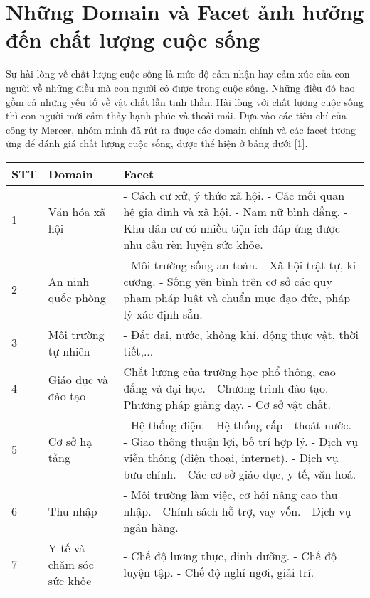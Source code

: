 \section{Những Domain và Facet ảnh hưởng đến chất lượng cuộc sống}
Sự hài lòng về chất lượng cuộc sống là mức độ cảm nhận hay cảm xúc của con người về những điều mà con người có được trong cuộc sống. Những điều đó bao gồm cả những yếu tố về vật chất lẫn tinh thần. Hài lòng với chất lượng cuộc sống thì con người mới cảm thấy hạnh phúc và thoải mái. Dựa vào các tiêu chí của công ty Mercer, nhóm mình đã rút ra được các domain chính và các facet tương ứng để đánh giá chất lượng cuộc sống, được thể hiện ở bảng dưới [1].
\begin{center}
\begin{tabular}{ | m{1.1cm} | m{4cm}| m{6.5cm} | } 
  \hline
  STT& Domain & Facet \\ 
  \hline
  1 & Văn hóa xã hội & - Cách cư xử, ý thức xã hội. \newline - Các mối quan hệ gia đình và xã hội. \newline - Nam nữ bình đẳng. \newline - Khu dân cư có nhiều tiện ích đáp ứng được nhu cầu rèn luyện sức khỏe.\\ 
  \hline
  2 & An ninh quốc phòng & - Môi trường sống an toàn. \newline - Xã hội trật tự, kỉ cương. \newline - Sống yên bình trên cơ sở các quy phạm pháp luật và chuẩn mực đạo đức, pháp lý xác định sẵn.  \\ 
  \hline
  3 & Môi trường tự nhiên & - Đất đai, nước, không khí, động thực vật, thời tiết,... \\ 
  \hline
  4 & Giáo dục và đào tạo & Chất lượng của trường học phổ thông, cao đẳng và đại  học. \newline - Chương trình đào tạo. \newline - Phương pháp giảng dạy. \newline - Cơ sở vật chất. \\ 
  \hline
  5 & Cơ sở hạ tầng & - Hệ thống điện. \newline - Hệ thống cấp - thoát nước. \newline - Giao thông thuận lợi, bố trí hợp lý. \newline - Dịch vụ viễn thông (điện thoại, internet). \newline - Dịch vụ bưu chính. \newline - Các cơ sở giáo dục, y tế, văn hoá. \\ 
  \hline
  6 & Thu nhập & - Môi trường làm việc, cơ hội nâng cao thu nhập. \newline - Chính sách hỗ trợ, vay vốn. \newline - Dịch vụ ngân hàng.\\ 
  \hline
  7 & Y tế và chăm sóc sức khỏe & - Chế độ lương thực, dinh dưỡng. \newline - Chế độ luyện tập. \newline - Chế độ nghỉ ngơi, giải trí. \\ 
  \hline
\end{tabular}
\end{center}